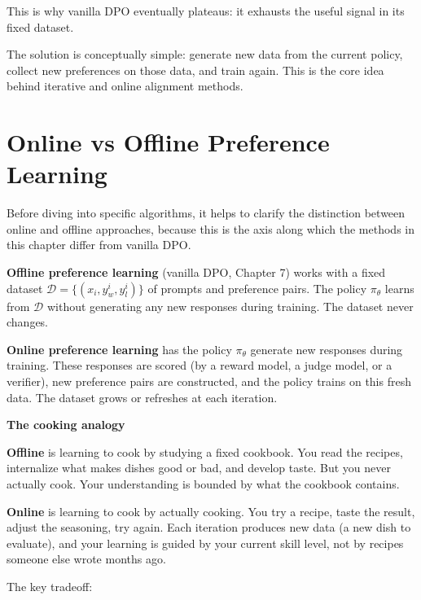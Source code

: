 \begin{chapterenv}
\begin{infobox}
This is why vanilla DPO eventually plateaus: it exhausts the useful signal in its fixed dataset.
\end{infobox}

The solution is conceptually simple: generate new data from the current policy, collect new preferences on those data, and train again. This is the core idea behind iterative and online alignment methods.

\section{Online vs Offline Preference Learning}

Before diving into specific algorithms, it helps to clarify the distinction between online and offline approaches, because this is the axis along which the methods in this chapter differ from vanilla DPO.

\textbf{Offline preference learning} (vanilla DPO, Chapter 7) works with a fixed dataset $\mathcal{D} = \{(x_i, y_w^i, y_l^i)\}$ of prompts and preference pairs. The policy $\pi_\theta$ learns from $\mathcal{D}$ without generating any new responses during training. The dataset never changes.

\textbf{Online preference learning} has the policy $\pi_\theta$ generate new responses during training. These responses are scored (by a reward model, a judge model, or a verifier), new preference pairs are constructed, and the policy trains on this fresh data. The dataset grows or refreshes at each iteration.

\begin{infobox}
\textbf{The cooking analogy}

\textbf{Offline} is learning to cook by studying a fixed cookbook. You read the recipes, internalize what makes dishes good or bad, and develop taste. But you never actually cook. Your understanding is bounded by what the cookbook contains.

\textbf{Online} is learning to cook by actually cooking. You try a recipe, taste the result, adjust the seasoning, try again. Each iteration produces new data (a new dish to evaluate), and your learning is guided by your current skill level, not by recipes someone else wrote months ago.
\end{infobox}

The key tradeoff:


\end{chapterenv}
